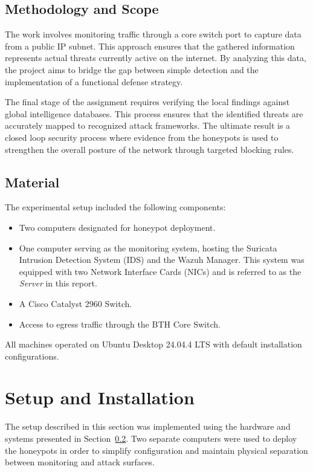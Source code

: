 \documentclass[11pt,a4paper]{article}
\begin{document}
\subsection{Methodology and Scope}
The work involves monitoring traffic through a core switch port to capture data from a public IP subnet. This approach ensures that the gathered information represents actual threats currently active on the internet. By analyzing this data, the project aims to bridge the gap between simple detection and the implementation of a functional defense strategy.

The final stage of the assignment requires verifying the local findings against global intelligence databases. This process ensures that the identified threats are accurately mapped to recognized attack frameworks. The ultimate result is a closed loop security process where evidence from the honeypots is used to strengthen the overall posture of the network through targeted blocking rules.

\subsection{Material}
\label{sec:material}
The experimental setup included the following components:

\begin{itemize}
\item Two computers designated for honeypot deployment.
\item One computer serving as the monitoring system, hosting the Suricata Intrusion Detection System (IDS) and the Wazuh Manager. This system was equipped with two Network Interface Cards (NICs) and is referred to as the \textit{Server} in this report.
\item A Cisco Catalyst 2960 Switch.
\item Access to egress traffic through the BTH Core Switch.
\end{itemize}

All machines operated on Ubuntu Desktop 24.04.4 LTS with default installation configurations.


\newpage
\section{Setup and Installation}

The setup described in this section was implemented using the hardware and systems presented in Section~\ref{sec:material}. Two separate computers were used to deploy the honeypots in order to simplify configuration and maintain physical separation between monitoring and attack surfaces.
\end{document}
